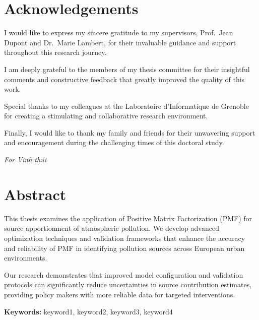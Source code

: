 \documentclass[
  letterpaper,
  oneside,
  openany]{MastersDoctoralThesis}
\begin{document}
\chapter*{Acknowledgements}\label{acknowledgements}


I would like to express my sincere gratitude to my supervisors,
Prof.~Jean Dupont and Dr.~Marie Lambert, for their invaluable guidance
and support throughout this research journey.

I am deeply grateful to the members of my thesis committee for their
insightful comments and constructive feedback that greatly improved the
quality of this work.

Special thanks to my colleagues at the Laboratoire d'Informatique de
Grenoble for creating a stimulating and collaborative research
environment.

Finally, I would like to thank my family and friends for their
unwavering support and encouragement during the challenging times of
this doctoral study.

\clearpage
\begin{center}
\vspace*{\fill}
\textit{For Vinh thúi}
\vspace*{\fill}
\end{center}


\chapter*{Abstract}\label{abstract}


This thesis examines the application of Positive Matrix Factorization
(PMF) for source apportionment of atmospheric pollution. We develop
advanced optimization techniques and validation frameworks that enhance
the accuracy and reliability of PMF in identifying pollution sources
across European urban environments.

Our research demonstrates that improved model configuration and
validation protocols can significantly reduce uncertainties in source
contribution estimates, providing policy makers with more reliable data
for targeted interventions.

\textbf{Keywords:} keyword1, keyword2, keyword3, keyword4
\end{document}
